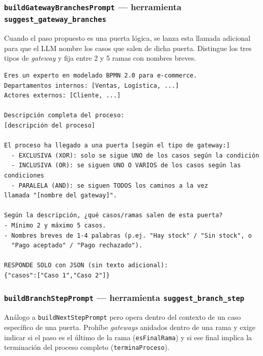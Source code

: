 \subsubsection{\texttt{buildGatewayBranchesPrompt} — herramienta \texttt{suggest\_gateway\_branches}}

Cuando el paso propuesto es una puerta lógica, se lanza esta llamada adicional para que el LLM nombre los casos que salen de dicha puerta. Distingue los tres tipos de \textit{gateway} y fija entre 2 y 5 ramas con nombres breves.

\begin{lstlisting}[style=promptbox]
Eres un experto en modelado BPMN 2.0 para e-commerce.
Departamentos internos: [Ventas, Logística, ...]
Actores externos: [Cliente, ...]

Descripción completa del proceso:
[descripción del proceso]

El proceso ha llegado a una puerta [según el tipo de gateway:]
  - EXCLUSIVA (XOR): solo se sigue UNO de los casos según la condición
  - INCLUSIVA (OR): se siguen UNO O VARIOS de los casos según las condiciones
  - PARALELA (AND): se siguen TODOS los caminos a la vez
llamada "[nombre del gateway]".

Según la descripción, ¿qué casos/ramas salen de esta puerta?
- Mínimo 2 y máximo 5 casos.
- Nombres breves de 1-4 palabras (p.ej. "Hay stock" / "Sin stock", o
  "Pago aceptado" / "Pago rechazado").

RESPONDE SOLO con JSON (sin texto adicional):
{"casos":["Caso 1","Caso 2"]}
\end{lstlisting}

\subsubsection{\texttt{buildBranchStepPrompt} — herramienta \texttt{suggest\_branch\_step}}

Análogo a \texttt{buildNextStepPrompt} pero opera dentro del contexto de un caso específico de una puerta. Prohíbe \textit{gateways} anidados dentro de una rama y exige indicar si el paso es el último de la rama (\texttt{esFinalRama}) y si ese final implica la terminación del proceso completo (\texttt{terminaProceso}).

